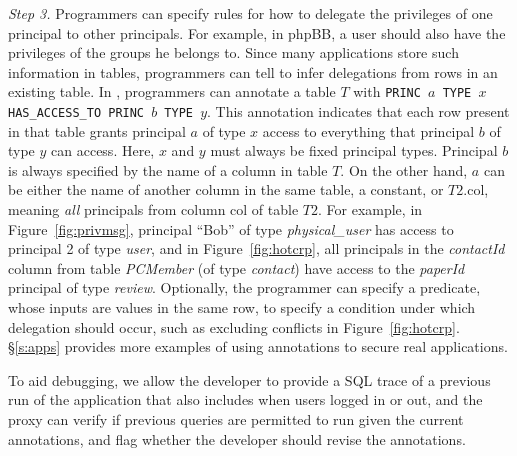 {\em Step 3.}  Programmers can specify rules for how to delegate the
privileges of one principal to other principals.  For example, in
phpBB, a user should also have the privileges of the groups he belongs
to.  Since many applications store such information in tables,
programmers can tell \name to infer delegations from rows in an
existing table.  In \name, programmers can annotate a table $T$ with
{\tt \small PRINC $a$ TYPE $x$ HAS\_ACCESS\_TO PRINC $b$ TYPE $y$}.
This annotation indicates that each row present in that table grants
principal $a$ of type $x$ access to everything that principal $b$ of
type $y$ can access.  Here, $x$ and $y$ must always be fixed principal
types.  Principal $b$ is always specified by the name of a column in
table $T$.  On the other hand, $a$ can be either the name of another
column in the same table, a constant, or $T2.\textrm{col}$, meaning {\em all}
principals from column $\textrm{col}$ of table $T2$.  For example, in
Figure~\ref{fig:privmsg}, principal ``Bob'' of type {\em
  physical\_user} has access to principal 2 of type {\em user}, and
in Figure~\ref{fig:hotcrp}, all principals in the {\em contactId}
column from table {\em PCMember} (of type {\em contact}) have access
to the {\em paperId} principal of type {\em review}.  Optionally, the
programmer can specify a predicate, whose inputs are values in the
same row, to specify a condition under which delegation should occur,
such as excluding conflicts in Figure~\ref{fig:hotcrp}.
\S\ref{s:apps} provides more examples of using annotations to secure
real applications.



To aid debugging, we allow the developer to provide a SQL trace of a
previous run of the application that also includes when users logged
in or out, and the proxy can verify if previous queries are permitted
to run given the current annotations, and flag whether the developer
should revise the annotations.



